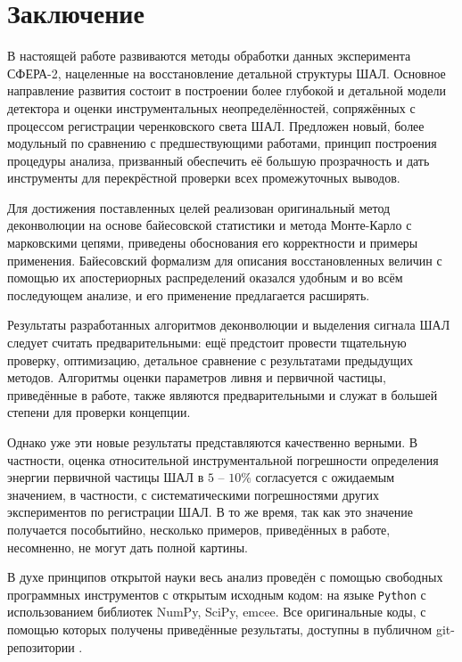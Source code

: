 \chapter{Заключение}

В настоящей работе развиваются методы обработки данных эксперимента СФЕРА-2, нацеленные на восстановление детальной структуры ШАЛ. Основное направление развития состоит в построении более глубокой и детальной модели детектора и оценки инструментальных неопределённостей, сопряжённых с процессом регистрации черенковского света ШАЛ. Предложен новый, более модульный по сравнению с предшествующими работами, принцип построения процедуры анализа, призванный обеспечить её большую прозрачность и дать инструменты для перекрёстной проверки всех промежуточных выводов.

Для достижения поставленных целей реализован оригинальный метод деконволюции на основе байесовской статистики и метода Монте-Карло с марковскими цепями, приведены обоснования его корректности и примеры применения. Байесовский формализм для описания восстановленных величин с помощью их апостериорных распределений оказался удобным и во всём последующем анализе, и его применение предлагается расширять.

Результаты разработанных алгоритмов деконволюции и выделения сигнала ШАЛ следует считать предварительными: ещё предстоит провести тщательную проверку, оптимизацию, детальное сравнение с результатами предыдущих методов. Алгоритмы оценки параметров ливня и первичной частицы, приведённые в работе, также являются предварительными и служат в большей степени для проверки концепции.

Однако уже эти новые результаты представляются качественно верными. В частности, оценка относительной инструментальной погрешности определения энергии первичной частицы ШАЛ в $5$ -- $10 \%$ согласуется с ожидаемым значением, в частности, с систематическими погрешностями других экспериментов по регистрации ШАЛ. В то же время, так как это значение получается пособытийно, несколько примеров, приведённых в работе, несомненно, не могут дать полной картины.

В духе принципов открытой науки весь анализ проведён с помощью свободных программных инструментов с открытым исходным кодом: на языке \verb|Python| с использованием библиотек NumPy, SciPy, emcee. Все оригинальные коды, с помощью которых получены приведённые результаты, доступны в публичном git-репозитории .
